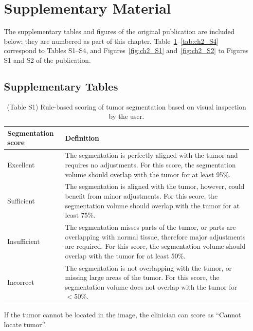 \clearpage
\section{Supplementary Material}
\label{sec:ch2_supplement}
The supplementary tables and figures of the original publication are included below; they are numbered as part of this chapter.
Table~\ref{tab:ch2_S1}--\ref{tab:ch2_S4} correspond to Tables S1--S4, and Figures~\ref{fig:ch2_S1} and~\ref{fig:ch2_S2} to Figures S1 and S2 of the publication.

\subsection{Supplementary Tables}

\begin{table}[htbp]
	\caption{(Table S1) Rule-based scoring of tumor segmentation based on visual inspection by the user.}
	\label{tab:ch2_S1}
	\begin{tabular}{@{}lp{9cm}@{}}
		\toprule
		\textbf{Segmentation score} & \textbf{Definition} \\
		\midrule
		Excellent & The segmentation is perfectly aligned with the tumor and requires no adjustments. For this score, the segmentation volume should overlap with the tumor for at least 95\%. \\
		Sufficient & The segmentation is aligned with the tumor, however, could benefit from minor adjustments. For this score, the segmentation volume should overlap with the tumor for at least 75\%. \\
		Insufficient & The segmentation misses parts of the tumor, or parts are overlapping with normal tissue, therefore major adjustments are required. For this score, the segmentation volume should overlap with the tumor for at least 50\%. \\
		Incorrect & The segmentation is not overlapping with the tumor, or missing large areas of the tumor. For this score, the segmentation volume does not overlap with the tumor for $<$50\%. \\
		\bottomrule
	\end{tabular}

	\vspace{2mm}
	\parbox{\textwidth}{\footnotesize If the tumor cannot be located in the image, the clinician can score as ``Cannot locate tumor''.}
\end{table}

